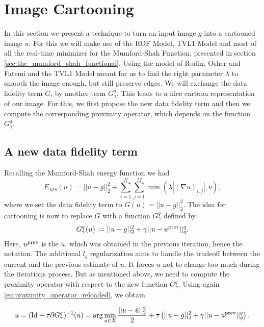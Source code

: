 \section{Image Cartooning} %
\label{sec:image_cartooning}
    
    In this section we present a technique to turn an input image $g$ into a cartooned image $u$. For this we will make use of the ROF Model, TVL1 Model and most of all the real-time minimizer for the Mumford-Shah Function, presented in section \ref{sec:the_mumford_shah_functional}. Using the model of Rudin, Osher and Fatemi and the TVL1 Model meant for us to find the right parameter $\lambda$ to smooth the image enough, but still preserve edges. We will exchange the data fidelity term $G$, by another term $G^{q}_{\gamma}$. This leads to a nice cartoon representation of our image. For this, we first propose the new data fidelity term and then we compute the corresponding proximity operator, which depends on the function $G^{q}_{\gamma}$.

    \subsection{A new data fidelity term} %
    \label{sub:a_new_data_fidelity_term}

        Recalling the Mumford-Shah energy function we had
            $$
                E_{MS}(u) = ||u - g||_{2}^{2} + \sum_{i = 1}^{N} \sum_{j = 1}^{M} \min(\lambda |(\nabla u)_{i,j}|, \nu),
            $$
        where we set the data fidelity term to $G(u) = ||u - g||_{2}^{2}$. The idea for cartooning is now to replace $G$ with a function $G^{q}_{\gamma}$ defined by
            \begin{equation}
                G^{q}_{\gamma}(u) := ||u - g||_{2}^{2} + \gamma ||u - u^{\textnormal{prev}}||_{q}^{q}.
                \label{eq:ms_new_regularizer}
            \end{equation}
        Here, $u^{\textnormal{prev}}$ is the $u$, which was obtained in the previous iteration, hence the notation. The additional $l_{q}$ regularization aims to handle the tradeoff between the current and the previous estimate of $u$. It forces $u$ not to change too much during the iterations process. But as mentioned above, we need to compute the proximity operator with respect to the new function $G^{q}_{\gamma}$. Using again \ref{eq:proximity_operator_reloaded}, we obtain

            \begin{equation}
                u = (\textnormal{Id} + \tau \partial G^{q}_{\gamma})^{-1}(\tilde{u}) = \arg \min_{u \in X} \frac{||u - \tilde{u}||_{2}^{2}}{2} + \tau \left( ||u - g||_{2}^{2} + \gamma ||u - u^{\textnormal{prev}}||_{q}^{q} \right).
                \label{eq:prox_new_data_fidelity_term}
            \end{equation}

